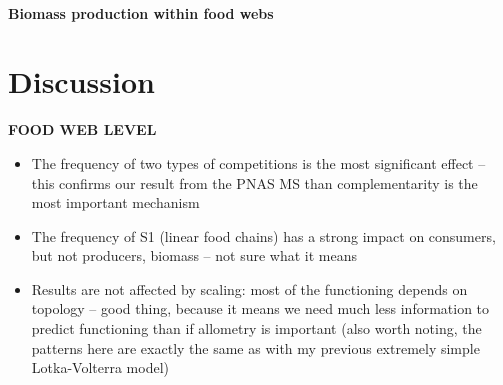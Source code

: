 \documentclass[12pt]{article}
\begin{document}
\paragraph{Biomass production within food webs}

\section{Discussion}

\textbf{FOOD WEB LEVEL}
\begin{itemize}
	\item The frequency of two types of competitions is the most significant effect -- this confirms our result from the PNAS MS than complementarity is the most important mechanism
	\item The frequency of S1 (linear food chains) has a strong impact on consumers, but not producers, biomass -- not sure what it means
	\item Results are not affected by scaling: most of the functioning depends on topology -- good thing, because it means we need much less information to predict functioning than if allometry is important (also worth noting, the patterns here are exactly the same as with my previous extremely simple Lotka-Volterra model)
\end{itemize}

\printbibliography
\end{document}
